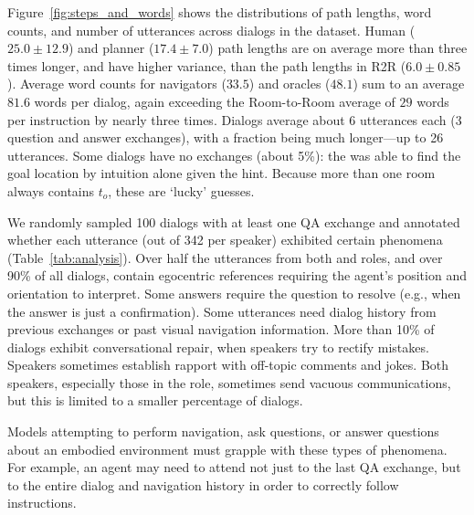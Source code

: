 Figure~\ref{fig:steps_and_words} shows the distributions of path lengths, word counts, and number of utterances across dialogs in the \dataset{} dataset.
Human ($25.0\pm12.9$) and planner ($17.4\pm7.0$) path lengths are on average more than three times longer, and have higher variance, than the path lengths in R2R ($6.0\pm0.85$).
Average word counts for navigators ($33.5$) and oracles ($48.1$) sum to an average $81.6$ words per dialog, again exceeding the Room-to-Room average of $29$ words per instruction by nearly three times.
Dialogs average about 6 utterances each (3 question and answer exchanges), with a fraction being much longer---up to 26 utterances.
Some dialogs have no exchanges (about 5\%): the \nav{} was able to find the goal location by intuition alone given the hint.
Because more than one room always contains $t_o$, these are `lucky' guesses.

We randomly sampled 100 dialogs with at least one QA exchange and annotated whether each utterance (out of 342 per speaker) exhibited certain phenomena (Table~\ref{tab:analysis}).
Over half the utterances from both \nav{} and \ora{} roles, and over 90\% of all dialogs, contain egocentric references requiring the agent's position and orientation to interpret.
Some \ora{} answers require the \nav{} question to resolve (e.g., when the answer is just a confirmation).
Some utterances need dialog history from previous exchanges or past visual navigation information.
More than 10\% of dialogs exhibit conversational repair, when speakers try to rectify mistakes.
Speakers sometimes establish rapport with off-topic comments and jokes.
Both speakers, especially those in the \nav{} role, sometimes send vacuous communications, but this is limited to a smaller percentage of dialogs.

Models attempting to perform navigation, ask questions, or answer questions about an embodied environment must grapple with these types of phenomena.
For example, an agent may need to attend not just to the last QA exchange, but to the entire dialog and navigation history in order to correctly follow instructions.

